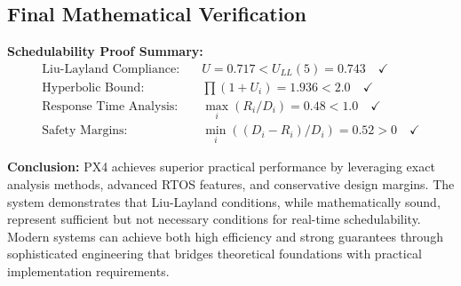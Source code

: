 \documentclass[12pt,a4paper]{article}
\begin{document}
\subsection{Final Mathematical Verification}

\textbf{Schedulability Proof Summary:}
\begin{align}
\text{Liu-Layland Compliance:} \quad & U = 0.717 < U_{LL}(5) = 0.743 \quad \checkmark \\
\text{Hyperbolic Bound:} \quad & \prod(1 + U_i) = 1.936 < 2.0 \quad \checkmark \\
\text{Response Time Analysis:} \quad & \max_i(R_i/D_i) = 0.48 < 1.0 \quad \checkmark \\
\text{Safety Margins:} \quad & \min_i((D_i - R_i)/D_i) = 0.52 > 0 \quad \checkmark
\end{align}

\textbf{Conclusion:} PX4 achieves superior practical performance by leveraging exact analysis methods, advanced RTOS features, and conservative design margins. The system demonstrates that Liu-Layland conditions, while mathematically sound, represent sufficient but not necessary conditions for real-time schedulability. Modern systems can achieve both high efficiency and strong guarantees through sophisticated engineering that bridges theoretical foundations with practical implementation requirements.
\end{document}
